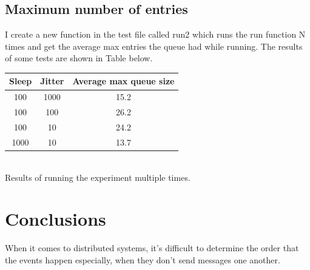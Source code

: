 \documentclass[a4paper, 11pt]{article}
\begin{document}
\subsection{Maximum number of entries}
I create a new function in the test file called run2 which runs the run function N times and get the average max entries the queue had while running. The results of some tests are shown in Table below.

\begin{center}
\begin{tabular}{ c c c }
Sleep & Jitter & Average max queue size \\
\hline
100 & 1000 & 15.2 \\
100 & 100 & 26.2 \\
100 & 10 & 24.2 \\
1000 & 10 & 13.7  \\ 
\end{tabular}\\
\caption{Results of running the experiment multiple times.}
\label{table_max}
\end{center}

\section{Conclusions}
When it comes to distributed systems, it's difficult to determine the order that the events happen especially, when they don't send messages one another.  
\end{document}
